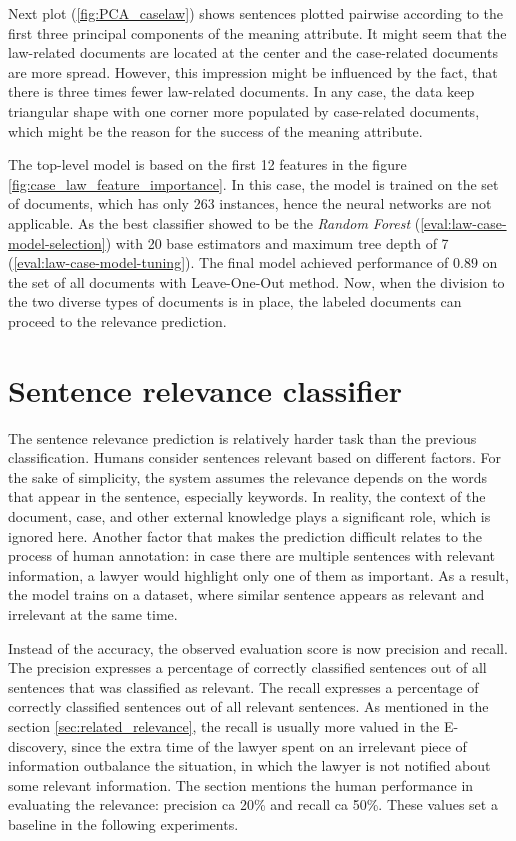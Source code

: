 \documentclass[
  digital, %
  notable,   %
  nolof,     %
  nolot,     %
]{fithesis3}
\begin{document}
Next plot (\ref{fig:PCA_caselaw}) shows sentences plotted pairwise according to the first three principal components of the meaning attribute.
It might seem that the law-related documents are located at the center and the case-related documents are more spread.
However, this impression might be influenced by the fact, that there is three times fewer law-related documents.
In any case, the data keep triangular shape with one corner more populated by case-related documents, which might be the reason for the success of the meaning attribute.


The top-level model is based on the first 12 features in the figure \ref{fig:case_law_feature_importance}.
In this case, the model is trained on the set of documents, which has only 263 instances, hence the neural networks are not applicable.
As the best classifier showed to be the \textit{Random Forest} (\ref{eval:law-case-model-selection}) with 20 base estimators and maximum tree depth of 7 (\ref{eval:law-case-model-tuning}). The final model achieved performance of $0.89$ on the set of all documents with Leave-One-Out method. Now, when the division to the two diverse types of documents is in place, the labeled documents can proceed to the relevance prediction.

\section{Sentence relevance classifier}
\label{sec:sentence-classifier}
The sentence relevance prediction is relatively harder task than the previous classification.
Humans consider sentences relevant based on different factors.
For the sake of simplicity, the system assumes the relevance depends on the words that appear in the sentence, especially keywords.
In reality, the context of the document, case, and other external knowledge plays a significant role, which is ignored here.
Another factor that makes the prediction difficult relates to the process of human annotation: in case there are multiple sentences with relevant information, a lawyer would highlight only one of them as important.
As a result, the model trains on a dataset, where similar sentence appears as relevant and irrelevant at the same time.

Instead of the accuracy, the observed evaluation score is now precision and recall.
The precision expresses a percentage of correctly classified sentences out of all sentences that was classified as relevant.
The recall expresses a percentage of correctly classified sentences out of all relevant sentences.
As mentioned in the section \ref{sec:related_relevance}, the recall is usually more valued in the E-discovery, since the extra time of the lawyer spent on an irrelevant piece of information outbalance the situation, in which the lawyer is not notified about some relevant information.
The section mentions the human performance in evaluating the relevance: precision ca 20\% and recall ca 50\%.
These values set a baseline in the following experiments.
\end{document}
